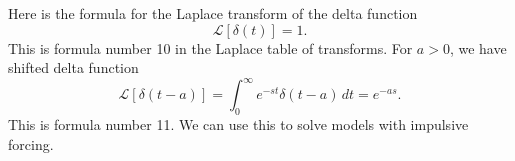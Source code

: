 \documentclass[10pt,letterpaper]{article}
\begin{document}
Here is the formula for the Laplace transform of the delta function
\[
\mathcal L[\delta(t)]=1.
\]
This is formula number 10 in the Laplace table of transforms. For $a>0$, we have shifted delta function
\[
\mathcal L[\delta(t-a)]
=\int_0^\infty e^{-st}\delta(t-a)\,dt
=e^{-as}.
\]
This is formula number 11. We can use this to solve models with impulsive forcing.






\end{document}

